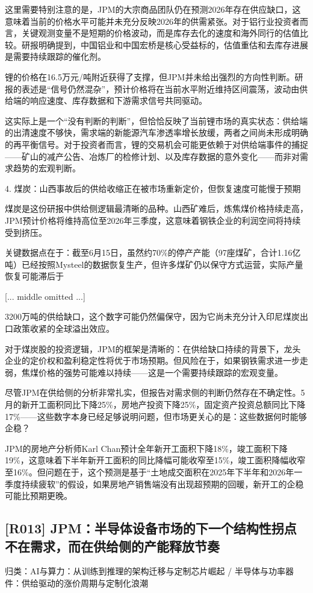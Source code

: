 \documentclass[11pt]{ctexart}
\begin{document}
这里需要特别注意的是，JPM的大宗商品团队仍在预测2026年存在供应缺口，这意味着当前的价格水平可能并未充分反映2026年的供需紧张。对于铝行业投资者而言，关键观测变量不是短期的价格波动，而是库存去化的速度和海外同行的估值比较。研报明确提到，中国铝业和中国宏桥是核心受益标的，估值重估和去库存进展是需要持续跟踪的催化剂。

锂的价格在16.5万元/吨附近获得了支撑，但JPM并未给出强烈的方向性判断。研报的表述是“信号仍然混杂”，预计价格将在当前水平附近维持区间震荡，波动由供给端的响应速度、库存数据和下游需求信号共同驱动。

这实际上是一个“没有判断的判断”，但恰恰反映了当前锂市场的真实状态：供给端的出清速度不够快，需求端的新能源汽车渗透率增长放缓，两者之间尚未形成明确的再平衡信号。对于投资者而言，锂的交易机会可能更依赖于对供给端事件的捕捉——矿山的减产公告、冶炼厂的检修计划、以及库存数据的意外变化——而非对需求趋势的宏观判断。

4. 煤炭：山西事故后的供给收缩正在被市场重新定价，但恢复速度可能慢于预期

煤炭是这份研报中供给侧逻辑最清晰的品种。山西矿难后，炼焦煤价格持续走高，JPM预计价格将维持高位至2026年三季度，这意味着钢铁企业的利润空间将持续受到挤压。

关键数据点在于：截至6月15日，虽然约70\%的停产产能（97座煤矿，合计1.16亿吨）已经按照Mysteel的数据恢复生产，但许多煤矿仍以保守方式运营，实际产量恢复可能滞后于

[... middle omitted ...]

3200万吨的供给缺口，这个数字可能仍然偏保守，因为它尚未充分计入印尼煤炭出口政策收紧的全球溢出效应。

对于煤炭股的投资逻辑，JPM的框架是清晰的：在供给缺口持续的背景下，龙头企业的定价权和盈利稳定性将优于市场预期。但风险在于，如果钢铁需求进一步走弱，焦煤价格的强势可能难以持续——这是一个需要持续跟踪的宏观变量。

尽管JPM在供给侧的分析非常扎实，但报告对需求侧的判断仍然存在不确定性。5月的新开工面积同比下降25\%，房地产投资下降25\%，固定资产投资总额同比下降17\%——这些数字本身已经足够说明问题，但市场更关心的是：这些数据何时能够企稳？

JPM的房地产分析师Karl Chan预计全年新开工面积下降18\%，竣工面积下降19\%，这意味着下半年新开工面积的同比降幅可能收窄至15\%，竣工面积降幅收窄至16\%。但问题在于，这个预测是基于“土地成交面积在2025年下半年和2026年一季度持续疲软”的假设，如果房地产销售端没有出现超预期的回暖，新开工的企稳可能比预期更晚。

\subsection{[R013] JPM：半导体设备市场的下一个结构性拐点不在需求，而在供给侧的产能释放节奏}
{\small\color{refgray}归类：AI与算力：从训练到推理的架构迁移与定制芯片崛起 / 半导体与功率器件：供给驱动的涨价周期与定制化浪潮}
\end{document}
